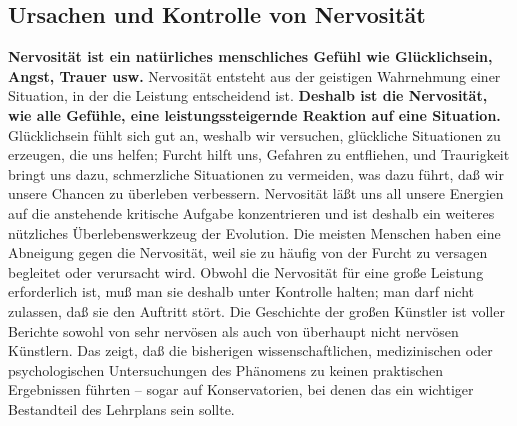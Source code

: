
\subsection{Ursachen und Kontrolle von Nervosität}
\label{c1iii15}
 
\textbf{Nervosität ist ein natürliches menschliches Gefühl wie Glücklichsein, Angst, Trauer usw.}
Nervosität entsteht aus der geistigen Wahrnehmung einer Situation, in der die Leistung entscheidend ist.
\textbf{Deshalb ist die Nervosität, wie alle Gefühle, eine leistungssteigernde Reaktion auf eine Situation.}
Glücklichsein fühlt sich gut an, weshalb wir versuchen, glückliche Situationen zu erzeugen, die uns helfen; Furcht hilft uns, Gefahren zu entfliehen, und Traurigkeit bringt uns dazu, schmerzliche Situationen zu vermeiden, was dazu führt, daß wir unsere Chancen zu überleben verbessern.
Nervosität läßt uns all unsere Energien auf die anstehende kritische Aufgabe konzentrieren und ist deshalb ein weiteres nützliches Überlebenswerkzeug der Evolution.
Die meisten Menschen haben eine Abneigung gegen die Nervosität, weil sie zu häufig von der Furcht zu versagen begleitet oder verursacht wird.
Obwohl die Nervosität für eine große Leistung erforderlich ist, muß man sie deshalb unter Kontrolle halten; man darf nicht zulassen, daß sie den Auftritt stört.
Die Geschichte der großen Künstler ist voller Berichte sowohl von sehr nervösen als auch von überhaupt nicht nervösen Künstlern.
Das zeigt, daß die bisherigen wissenschaftlichen, medizinischen oder psychologischen Untersuchungen des Phänomens  zu keinen praktischen Ergebnissen führten -- sogar auf Konservatorien, bei denen das ein wichtiger Bestandteil des Lehrplans sein sollte.

